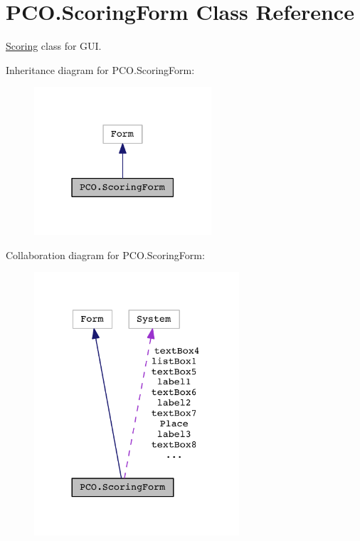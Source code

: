 \hypertarget{classPCO_1_1ScoringForm}{}\section{P\+C\+O.\+Scoring\+Form Class Reference}
\label{classPCO_1_1ScoringForm}


\hyperlink{classScoring}{Scoring} class for G\+UI.  




Inheritance diagram for P\+C\+O.\+Scoring\+Form\+:\nopagebreak
\begin{figure}[H]
\begin{center}
\leavevmode
\includegraphics[width=187pt]{classPCO_1_1ScoringForm__inherit__graph}
\end{center}
\end{figure}


Collaboration diagram for P\+C\+O.\+Scoring\+Form\+:\nopagebreak
\begin{figure}[H]
\begin{center}
\leavevmode
\includegraphics[width=216pt]{classPCO_1_1ScoringForm__coll__graph}
\end{center}
\end{figure}
